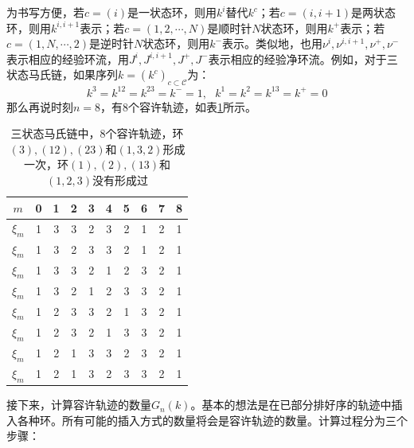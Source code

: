 为书写方便，若$c=(i)$是一状态环，则用$k^i$替代$k^c$；若$c=(i,i+1)$是两状态环，则用$k^{i,i+1}$表示；若$c=(1,2,\cdots,N)$是顺时针$N$状态环，则用$k^{+}$表示；若$c=(1,N,\cdots,2)$是逆时针$N$状态环，则用$k^{-}$表示。类似地，也用$\nu^i, \nu^{i,i+1}, \nu^+, \nu^-$表示相应的经验环流，用$J^i, J^{i, i+1}, J^{+}, J^{-}$表示相应的经验净环流。例如，对于三状态马氏链，如果序列$k=(k^c)_{c\subset \mathcal{C}}$为：
\begin{equation} \label{trajectory_ex}
    k^3 = k^{12} = k^{23} = k^- = 1, ~~~ k^1 = k^2 = k^{13} = k^+= 0
\end{equation}
那么再说时刻$n=8$，有8个容许轨迹，如表\ref{table:all possible trajectories}所示。

\begin{table}[htb!]
    \renewcommand\arraystretch{1.2}
    \begin{tabular}{cccccccccc}
    \hline
   $m$   & 0 & 1 & 2 & 3 & 4 & 5 & 6 & 7 & 8 \\\hline
   $\xi_m$& 1 & 3 & 3 & 2 & 3 & 2 & 1 & 2 & 1 \\\hline
   $\xi_m$& 1 & 3 & 2 & 3 & 3 & 2 & 1 & 2 & 1 \\\hline
   $\xi_m$& 1 & 3 & 3 & 2 & 1 & 2 & 3 & 2 & 1 \\\hline
   $\xi_m$& 1 & 3 & 2 & 1 & 2 & 3 & 3 & 2 & 1 \\\hline
   $\xi_m$& 1 & 2 & 3 & 3 & 2 & 1 & 3 & 2 & 1 \\\hline
   $\xi_m$& 1 & 2 & 3 & 2 & 1 & 3 & 3 & 2 & 1 \\\hline
   $\xi_m$& 1 & 2 & 1 & 3 & 3 & 2 & 3 & 2 & 1 \\\hline
   $\xi_m$& 1 & 2 & 1 & 3 & 2 & 3 & 3 & 2 & 1 \\\hline
    \end{tabular}\centering
    \caption{三状态马氏链中，8个容许轨迹，环$(3), (12), (23)$和$(1,3,2)$形成一次，环$(1), (2), (13)$和$(1,2,3)$没有形成过}
    \label{table:all possible trajectories}
\end{table}

接下来，计算容许轨迹的数量$G_n(k)$。基本的想法是在已部分排好序的轨迹中插入各种环。所有可能的插入方式的数量将会是容许轨迹的数量。计算过程分为三个步骤：

